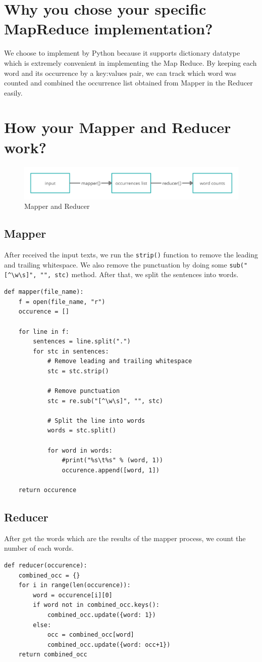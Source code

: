 \documentclass[times, 10pt]{thesisMDH}
\begin{document}
\titlePage

\newpage

\mainmatter

\section{Why you chose your specific MapReduce implementation?}
We choose to implement by Python because it supports dictionary datatype which is extremely convenient in implementing the Map Reduce. By keeping each word and its occurrence by a key:values pair, we can track which word was counted and combined the occurrence list obtained from Mapper in the Reducer easily.

\section{How your Mapper and Reducer work?}
\begin{figure}[H]
    \centering
    \includegraphics[width=1\linewidth]{images/4-1.png}
    \caption{Mapper and Reducer}
    \label{fig:my_label}
\end{figure}
\subsection{Mapper}
After received the input texts, we run the \verb|strip()| function to remove the leading and trailing whitespace. We also remove the punctuation by doing some \verb|sub("[^\w\s]", "", stc)| method. After that, we split the sentences into words.
\begin{lstlisting}
def mapper(file_name):
	f = open(file_name, "r")
	occurence = []

	for line in f:
		sentences = line.split(".")
		for stc in sentences:
			# Remove leading and trailing whitespace
			stc = stc.strip()

			# Remove punctuation
			stc = re.sub("[^\w\s]", "", stc)

			# Split the line into words
			words = stc.split()

			for word in words:
				#print("%s\t%s" % (word, 1))
				occurence.append([word, 1])

	return occurence
\end{lstlisting}
\subsection{Reducer}
After get the words which are the results of the mapper process, we count the number of each words.
\begin{lstlisting}
def reducer(occurence):
	combined_occ = {}
	for i in range(len(occurence)):
		word = occurence[i][0]
		if word not in combined_occ.keys():
			combined_occ.update({word: 1})
		else:
			occ = combined_occ[word]
			combined_occ.update({word: occ+1})
	return combined_occ
\end{lstlisting}
\end{document}
